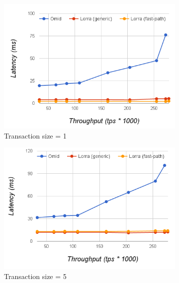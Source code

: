 \begin{figure}
  \centering
  \begin{subfigure}[t]{0.33\textwidth}
	\includegraphics[width=\textwidth]{figs/thpt-latency-1.png}
	\caption[]{Transaction size = 1}
         \label{fig:tl-1}
  \end{subfigure}
  \begin{subfigure}[t]{0.33\textwidth}
	\includegraphics[width=\textwidth]{figs/thpt-latency-5.png}
	\caption[]{Transaction size = 5}
    \label{fig:tl-5}
  \end{subfigure}
    \begin{subfigure}[t]{0.33\textwidth}

\end{subfigure}
\end{figure}
